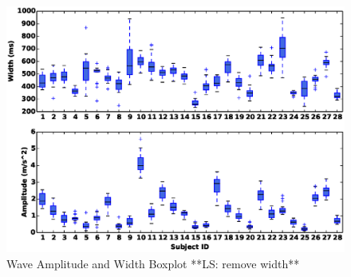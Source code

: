 \begin{figure}
\includegraphics[width=\columnwidth]{figure/width_amp_box.eps}
\centering
\caption{\label{fig:width_amp} Wave Amplitude and Width Boxplot **LS: remove width**}
\end{figure}

